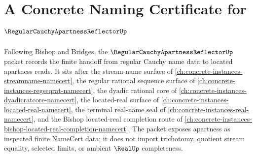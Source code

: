 \chapter{A Concrete Naming Certificate for $\RegularCauchyApartnessReflectorUp$}
\label{ch:concrete-instances-regular-cauchy-apartness-reflector-namecert}

Following Bishop and Bridges, the $\RegularCauchyApartnessReflectorUp$ packet records the finite handoff from regular Cauchy name data to located apartness reads. It sits after the stream-name surface of \autoref{ch:concrete-instances-streamname-namecert}, the regular rational sequence surface of \autoref{ch:concrete-instances-regseqrat-namecert}, the dyadic rational core of \autoref{ch:concrete-instances-dyadicratcore-namecert}, the located-real surface of \autoref{ch:concrete-instances-located-real-namecert}, the terminal real-name seal of \autoref{ch:concrete-instances-real-namecert}, and the Bishop located-real completion route of \autoref{ch:concrete-instances-bishop-located-real-completion-namecert}. The packet exposes apartness as inspected finite NameCert data; it does not import trichotomy, quotient stream equality, selected limits, or ambient $\RealUp$ completeness.

